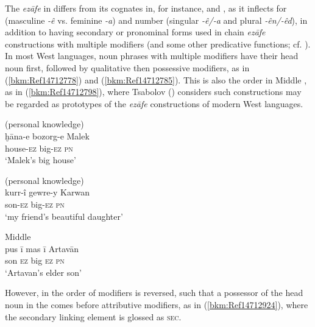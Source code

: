 \documentclass[output=paper]{langsci/langscibook}
\begin{document}

The \textit{ezāfe} in  differs from its cognates in, for instance,  and , as it inflects for  (masculine \textit{{}-ê} vs. feminine \textit{{}-a}) and number (singular \textit{{}-ê/-a} and plural \textit{{}-ên/-êd}), in addition to having secondary or pronominal forms used in chain \textit{ezāfe} constructions with multiple modifiers (and some other predicative functions; cf. \citealt{Haig2011,HaigÖpengin2018}). In most West  languages, noun phrases with multiple modifiers have their head noun first, followed by qualitative then possessive modifiers, as in (\ref{bkm:Ref14712778}) and (\ref{bkm:Ref14712785}). This is also the order in Middle , as in (\ref{bkm:Ref14712798}), where Tsabolov (\citeyear[122]{Tsabolov1994}) considers such constructions may be regarded as prototypes of the \textit{ezāfe} constructions of modern West  languages. 

\ea\label{bkm:Ref14712778} (personal knowledge)\\
\gll ḫāna-e bozorg-e Malek\\
     house-\textsc{ez} big-\textsc{ez} \textsc{pn}\\
\glt ‘Malek’s big house’
\z

\ea\label{bkm:Ref14712785}\label{bkm:Ref14771780}  (personal knowledge)\\
\gll kurr-î gewre-y Karwan\\
     son-\textsc{ez} big-\textsc{ez} \textsc{pn}\\
\glt ‘my friend’s beautiful daughter’
\z

\ea\label{bkm:Ref14712798}Middle  \citep[122]{Tsabolov1994}\\
\gll pus ī mas ī Artavān\\
     son \textsc{ez} big \textsc{ez} \textsc{pn}\\
\glt ‘Artavan’s elder son’
\z

However, in  the order of modifiers is reversed, such that a possessor of the head noun in the  comes before attributive modifiers, as in (\ref{bkm:Ref14712924}), where the secondary linking element is glossed as \textsc{sec}.  
\end{document}
